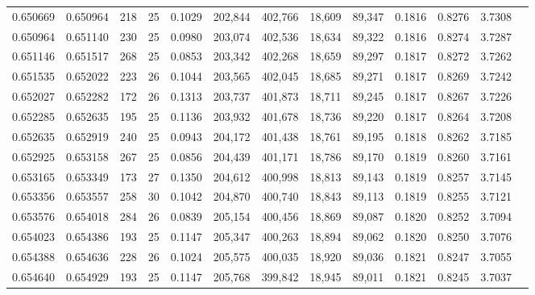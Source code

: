 \begin{tabular}{rrrrrrrrrrrrr}
0.650669 & 0.650964 &   218 &  25 &                                     0.1029 & 202,844 & 402,766 &  18,609 &  89,347 & 0.1816 & 0.8276 & 3.7308 \\
0.650964 & 0.651140 &   230 &  25 &                                     0.0980 & 203,074 & 402,536 &  18,634 &  89,322 & 0.1816 & 0.8274 & 3.7287 \\
0.651146 & 0.651517 &   268 &  25 &                                     0.0853 & 203,342 & 402,268 &  18,659 &  89,297 & 0.1817 & 0.8272 & 3.7262 \\
0.651535 & 0.652022 &   223 &  26 &                                     0.1044 & 203,565 & 402,045 &  18,685 &  89,271 & 0.1817 & 0.8269 & 3.7242 \\
0.652027 & 0.652282 &   172 &  26 &                                     0.1313 & 203,737 & 401,873 &  18,711 &  89,245 & 0.1817 & 0.8267 & 3.7226 \\
0.652285 & 0.652635 &   195 &  25 &                                     0.1136 & 203,932 & 401,678 &  18,736 &  89,220 & 0.1817 & 0.8264 & 3.7208 \\
0.652635 & 0.652919 &   240 &  25 &                                     0.0943 & 204,172 & 401,438 &  18,761 &  89,195 & 0.1818 & 0.8262 & 3.7185 \\
0.652925 & 0.653158 &   267 &  25 &                                     0.0856 & 204,439 & 401,171 &  18,786 &  89,170 & 0.1819 & 0.8260 & 3.7161 \\
0.653165 & 0.653349 &   173 &  27 &                                     0.1350 & 204,612 & 400,998 &  18,813 &  89,143 & 0.1819 & 0.8257 & 3.7145 \\
0.653356 & 0.653557 &   258 &  30 &                                     0.1042 & 204,870 & 400,740 &  18,843 &  89,113 & 0.1819 & 0.8255 & 3.7121 \\
0.653576 & 0.654018 &   284 &  26 &                                     0.0839 & 205,154 & 400,456 &  18,869 &  89,087 & 0.1820 & 0.8252 & 3.7094 \\
0.654023 & 0.654386 &   193 &  25 &                                     0.1147 & 205,347 & 400,263 &  18,894 &  89,062 & 0.1820 & 0.8250 & 3.7076 \\
0.654388 & 0.654636 &   228 &  26 &                                     0.1024 & 205,575 & 400,035 &  18,920 &  89,036 & 0.1821 & 0.8247 & 3.7055 \\
0.654640 & 0.654929 &   193 &  25 &                                     0.1147 & 205,768 & 399,842 &  18,945 &  89,011 & 0.1821 & 0.8245 & 3.7037 \\

\end{tabular}
